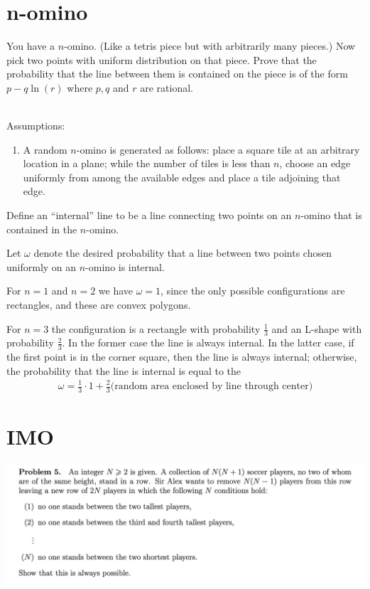 \documentclass[12pt]{article}
\begin{document}
\section{n-omino}
\begin{mdframed}
  You have a $n$-omino. (Like a tetris piece but with arbitrarily many pieces.)
  Now pick two points with uniform distribution on that piece. Prove that the
  probability that the line between them is contained on the piece is of the
  form $p - q\ln(r)$ where $p,q$ and $r$ are rational.
\end{mdframed}
~\\

Assumptions:
\begin{enumerate}
\item A random $n$-omino is generated as follows: place a square tile at an
  arbitrary location in a plane; while the number of tiles is less than $n$,
  choose an edge uniformly from among the available edges and place a tile
  adjoining that edge.
\end{enumerate}

Define an ``internal'' line to be a line connecting two points on an $n$-omino
that is contained in the $n$-omino.

Let $\omega$ denote the desired probability that a line between two points
chosen uniformly on an $n$-omino is internal.

For $n=1$ and $n=2$ we have $\omega = 1$, since the only possible
configurations are rectangles, and these are convex polygons.

For $n=3$ the configuration is a rectangle with probability $\frac{1}{3}$ and
an L-shape with probability $\frac{2}{3}$. In the former case the line is
always internal. In the latter case, if the first point is in the corner
square, then the line is always internal; otherwise, the probability that the
line is internal is equal to the
\begin{align*}
  \omega = \frac{1}{3}\cdot 1 + \frac{2}{3} \Big(\text{random area enclosed by line through center}\Big)
\end{align*}

\section{IMO}

\newpage
\begin{mdframed}
\includegraphics[width=400pt]{img/puzzles-imo-2017-5.png}
\end{mdframed}
\end{document}
